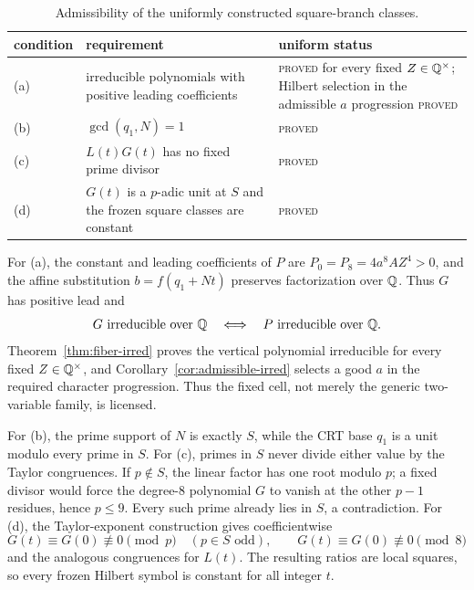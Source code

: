 \begin{table}[ht]
\centering
\small
\begin{tabular}{@{}p{}p{}p{}@{}}
\toprule
condition & requirement & uniform status\\
\midrule
(a) & irreducible polynomials with positive leading coefficients &
\textsc{proved} for every fixed $Z\in\mathbb{Q}^\times$; Hilbert selection in the
admissible $a$ progression \textsc{proved}\\
(b) & $\gcd(q_1,N)=1$ & \textsc{proved}\\
(c) & $L(t)G(t)$ has no fixed prime divisor & \textsc{proved}\\
(d) & $G(t)$ is a $p$-adic unit at $S$ and the frozen square classes are
constant & \textsc{proved}\\
\bottomrule
\end{tabular}
\caption{Admissibility of the uniformly constructed square-branch classes.}
\label{tab:admissibility}
\end{table}

For (a), the constant and leading coefficients of $P$ are
$P_0=P_8=4a^8AZ^4>0$, and the affine substitution
$b=f(q_1+Nt)$ preserves factorization over $\mathbb{Q}$.  Thus $G$ has positive
lead and
\[
 G\text{ irreducible over }\mathbb{Q}
 \quad\Longleftrightarrow\quad
 P\text{ irreducible over }\mathbb{Q}.
\]
Theorem~\ref{thm:fiber-irred} proves the vertical polynomial irreducible
for every fixed $Z\in\mathbb{Q}^\times$, and
Corollary~\ref{cor:admissible-irred} selects a good $a$ in the required
character progression.  Thus the fixed cell, not merely the generic
two-variable family, is licensed.

For (b), the prime support of $N$ is exactly $S$, while the CRT base
$q_1$ is a unit modulo every prime in $S$.  For (c), primes in $S$ never
divide either value by the Taylor congruences.  If $p\notin S$, the linear
factor has one root modulo $p$; a fixed divisor would force the degree-$8$
polynomial $G$ to vanish at the other $p-1$ residues, hence $p\le9$.
Every such prime already lies in $S$, a contradiction.  For (d), the
Taylor-exponent construction gives coefficientwise
\[
 G(t)\equiv G(0)\not\equiv0\pmod p
 \quad(p\in S\text{ odd}),\qquad
 G(t)\equiv G(0)\not\equiv0\pmod8
\]
and the analogous congruences for $L(t)$.  The resulting ratios are local
squares, so every frozen Hilbert symbol is constant for all integer $t$.

